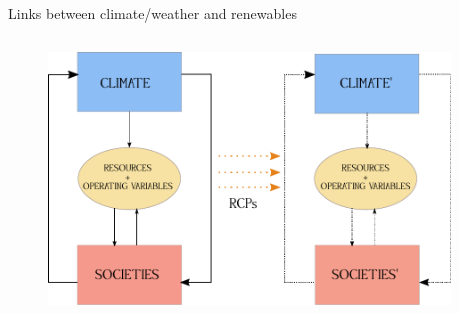 \documentclass{beamer}%
\begin{document}
\begin{frame}[fragile]{Links between climate/weather and renewables}
  \begin{columns}
    \begin{column}{0.7\textwidth}
  \begin{figure}
    \centering\includegraphics[scale=0.55]{drawing.pdf}
\end{figure}
  \end{column}
  \begin{column}{0.3\textwidth}
    \end{column}
    \end{columns}
\end{frame}
\end{document}
